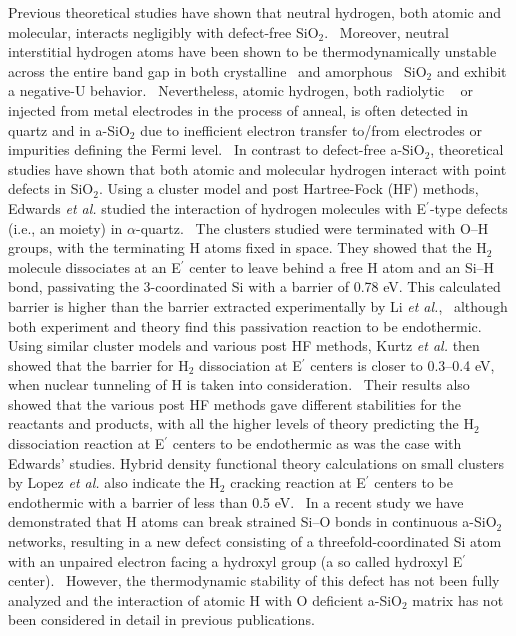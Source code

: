\documentclass[aps,prb,reprint,superscriptaddress,showpacs]{revtex4-1}
\begin{document}
Previous theoretical studies have shown that neutral hydrogen, both atomic and molecular, interacts negligibly with defect-free SiO$_2$.~\cite{blochl_vacancies,yokozawa_h} Moreover, neutral interstitial hydrogen atoms have been shown to be thermodynamically unstable across the entire band gap in both crystalline~\cite{blochl_vacancies} and amorphous~\cite{godet_hydrogen} SiO$_2$ and exhibit a negative-U behavior.~\cite{godet_hydrogen,robertson_oxides} Nevertheless, atomic hydrogen, both radiolytic ~\cite{griscom_hydrogen} or injected from metal electrodes in the process of anneal, is often detected in quartz and in a-SiO$_2$ due to inefficient electron transfer to/from electrodes or impurities defining the Fermi level.~\cite{griscom_hydrogen} In contrast to defect-free a-SiO$_2$, theoretical studies have shown that both atomic and molecular hydrogen interact with point defects in SiO$_2$. Using a cluster model and post Hartree-Fock (HF) methods, Edwards \emph{et al.} studied the interaction of hydrogen molecules with E$^\prime$-type defects (i.e., an \setatomsep{2em}\hspace{2 pt} moiety) in $\alpha$-quartz.~\cite{edwards_h2} The clusters studied were terminated with O--H groups, with the terminating H atoms fixed in space. They showed that the H$_2$ molecule dissociates at an E$^\prime$ center to leave behind a free H atom and an Si--H bond, passivating the 3-coordinated Si with a barrier of 0.78 eV. This calculated barrier is higher than the barrier extracted experimentally by Li \emph {et al.},~\cite{h2crack_li} although both experiment and theory find this passivation reaction to be endothermic. Using similar cluster models and various post HF methods, Kurtz \emph{et al.} then showed that the barrier for H$_2$ dissociation at E$^\prime$ centers is closer to 0.3--0.4 eV, when nuclear tunneling of H is taken into consideration.~\cite{kurtz_h2} Their results also showed that the various post HF methods gave different stabilities for the reactants and products, with all the higher levels of theory predicting the H$_2$ dissociation reaction at E$^\prime$ centers to be endothermic as was the case with Edwards' studies. Hybrid density functional theory calculations on small clusters by Lopez \emph{et al.} also indicate the H$_2$ cracking reaction at E$^\prime$ centers to be endothermic with a barrier of less than 0.5 eV.~\cite{h2crack_sidb_ts} In a recent study we have demonstrated that H atoms can break strained \mbox{Si--O} bonds in continuous a-SiO$_2$ networks, resulting in a new defect consisting of a threefold-coordinated Si atom with an unpaired electron facing a hydroxyl group (a so called hydroxyl E$^\prime$ center).~\cite{aelsayed_prl} However, the thermodynamic stability of this defect has not been fully analyzed and the interaction of atomic H with O deficient a-SiO$_2$ matrix has not been considered in detail in previous publications.
\end{document}
